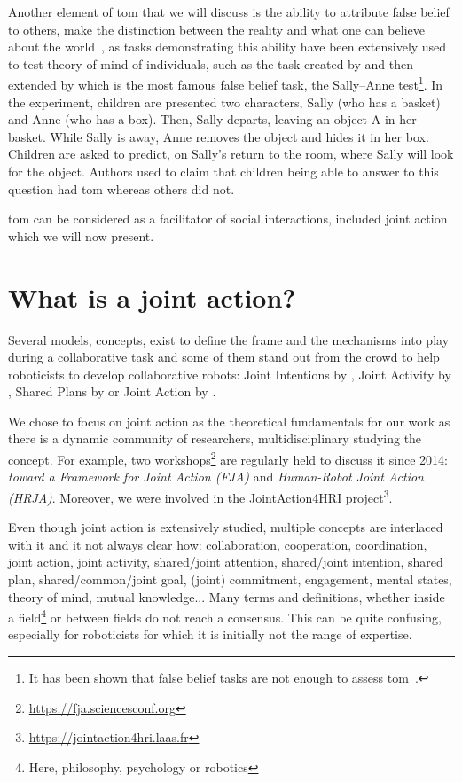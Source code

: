\documentclass[a4paper,11pt,twoside]{StyleThese}
\begin{document}
Another element of \acrshort{tom} that we will discuss is the ability to attribute false belief to others, \ie make the distinction between the reality and what one can believe about the world~\citep{dennett_1978_brainstorms}, as tasks demonstrating this ability have been extensively used to test theory of mind of individuals, such as the task created by \cite{wimmer_1983_beliefs} and then extended by \cite{baron_1985_does} which is the most famous false belief task, the Sally--Anne test\footnote{It has been shown that false belief tasks are not enough to assess \acrshort{tom}~\citep{bloom_2000_two, wellman_2001_meta}.}. In the experiment, children are presented two characters, Sally (who has a basket) and Anne (who has a box). Then, Sally departs, leaving an object A in her basket. While Sally is away, Anne removes the object and hides it in her box. Children are asked to predict, on Sally's return to the room, where Sally will look for the object. Authors used to claim that children being able to answer to this question had \acrshort{tom} whereas others did not.

\bigskip

\acrlong{tom} can be considered as a facilitator of social interactions, included joint action which we will now present.

\section{What is a joint action?}\label{chap1:sec:ja}
Several models, concepts, exist to define the frame and the mechanisms into play during a collaborative task and some of them stand out from the crowd to help roboticists to develop collaborative robots: Joint Intentions by \cite{cohen_1991_teamwork}, Joint Activity by \cite{klein_2005_common}, Shared Plans by \cite{grosz_1996_collaborative} or Joint Action by \cite{sebanz_2006_joint}.

We chose to focus on joint action as the theoretical fundamentals for our work as there is a dynamic community of researchers, multidisciplinary studying the concept. For example, two workshops\footnote{\url{https://fja.sciencesconf.org}} are regularly held to discuss it since 2014: \textit{toward a Framework for Joint Action (FJA)} and \textit{Human-Robot Joint Action (HRJA)}. Moreover, we were involved in the JointAction4HRI project\footnote{\url{https://jointaction4hri.laas.fr}}.

Even though joint action is extensively studied, multiple concepts are interlaced with it and it not always clear how: collaboration, cooperation, coordination, joint action, joint activity, shared/joint attention, shared/joint intention, shared plan, shared/common/joint goal, (joint) commitment, engagement, mental states, theory of mind, mutual knowledge... Many terms and definitions, whether inside a field\footnote{Here, philosophy, psychology or robotics} or between fields do not reach a consensus. This can be quite confusing, especially for roboticists for which it is initially not the range of expertise. 
\end{document}
